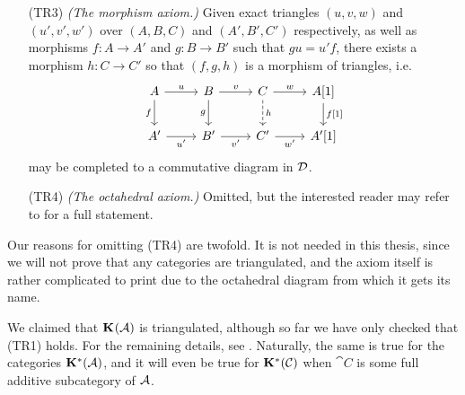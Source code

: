 \begin{definition}
\begin{enumerate}[leftmargin=4.4em]
    \item[(TR3)]
      \emph{(The morphism axiom.)}
      Given exact triangles $(u, v, w)$ and $(u', v', w')$ over $(A,
      B, C)$ and $(A', B', C')$ respectively, as well as morphisms
      $f: A \to A'$ and $g: B \to B'$ such that $gu = u' f$, there
      exists a morphism $h: C \to C'$ so that $(f, g, h)$ is a
      morphism of triangles, i.e.
      \[
        \begin{tikzcd}
          A & B & C & {A[1]} \\
          {A'} & B' & C' & {A'[1]}
          \arrow["u", from=1-1, to=1-2]
          \arrow["f"', from=1-1, to=2-1]
          \arrow["v", from=1-2, to=1-3]
          \arrow["g"', from=1-2, to=2-2]
          \arrow["w", from=1-3, to=1-4]
          \arrow[dashed, "h", from=1-3, to=2-3]
          \arrow["{f[1]}", from=1-4, to=2-4]
          \arrow["{u'}"', from=2-1, to=2-2]
          \arrow["{v'}"', from=2-2, to=2-3]
          \arrow["{w'}"', from=2-3, to=2-4]
        \end{tikzcd}
      \]
      may be completed to a commutative diagram in $\triangcat{D}$.

    \item[(TR4)]
      \emph{(The octahedral axiom.)}
      Omitted, but the interested reader may refer to
      \cite[Definition~10.2.1]{weibel} for a full statement.
  \end{enumerate}
\end{definition}

Our reasons for omitting (TR4) are twofold.
It is not needed in this thesis, since we will not prove that any
categories are triangulated, and the axiom itself is rather
complicated to print due to the octahedral diagram from which it gets its name.

\begin{example}
  We claimed that $\homcat{\abcat{A}}$ is triangulated, although so
  far we have only checked that (TR1) holds.
  For the remaining details, see \cite[Proposition~10.2.4]{weibel}.
  Naturally, the same is true for the categories
  $\homcat[*]{\abcat{A}}$, and it will even be true for
  $\homcat[*]{\cat{C}}$ when $\cat{C}$ is some full additive
  subcategory of $\abcat{A}$.
\end{example}

